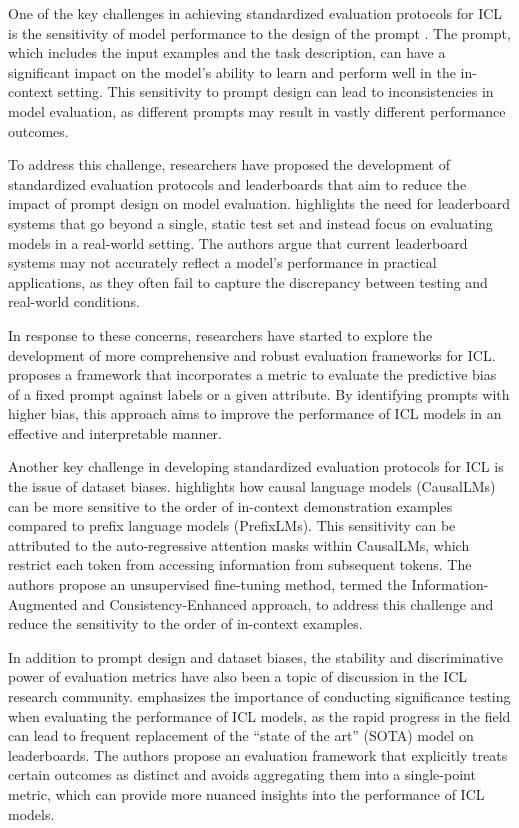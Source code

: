\documentclass[11pt]{article}
\begin{document}
One of the key challenges in achieving standardized evaluation protocols for ICL is the sensitivity of model performance to the design of the prompt \cite{ref51}. The prompt, which includes the input examples and the task description, can have a significant impact on the model's ability to learn and perform well in the in-context setting. This sensitivity to prompt design can lead to inconsistencies in model evaluation, as different prompts may result in vastly different performance outcomes.

To address this challenge, researchers have proposed the development of standardized evaluation protocols and leaderboards that aim to reduce the impact of prompt design on model evaluation. \cite{ref290} highlights the need for leaderboard systems that go beyond a single, static test set and instead focus on evaluating models in a real-world setting. The authors argue that current leaderboard systems may not accurately reflect a model's performance in practical applications, as they often fail to capture the discrepancy between testing and real-world conditions.

In response to these concerns, researchers have started to explore the development of more comprehensive and robust evaluation frameworks for ICL. \cite{ref291} proposes a framework that incorporates a metric to evaluate the predictive bias of a fixed prompt against labels or a given attribute. By identifying prompts with higher bias, this approach aims to improve the performance of ICL models in an effective and interpretable manner.

Another key challenge in developing standardized evaluation protocols for ICL is the issue of dataset biases. \cite{ref292} highlights how causal language models (CausalLMs) can be more sensitive to the order of in-context demonstration examples compared to prefix language models (PrefixLMs). This sensitivity can be attributed to the auto-regressive attention masks within CausalLMs, which restrict each token from accessing information from subsequent tokens. The authors propose an unsupervised fine-tuning method, termed the Information-Augmented and Consistency-Enhanced approach, to address this challenge and reduce the sensitivity to the order of in-context examples.

In addition to prompt design and dataset biases, the stability and discriminative power of evaluation metrics have also been a topic of discussion in the ICL research community. \cite{ref293} emphasizes the importance of conducting significance testing when evaluating the performance of ICL models, as the rapid progress in the field can lead to frequent replacement of the ``state of the art'' (SOTA) model on leaderboards. The authors propose an evaluation framework that explicitly treats certain outcomes as distinct and avoids aggregating them into a single-point metric, which can provide more nuanced insights into the performance of ICL models.
\end{document}
